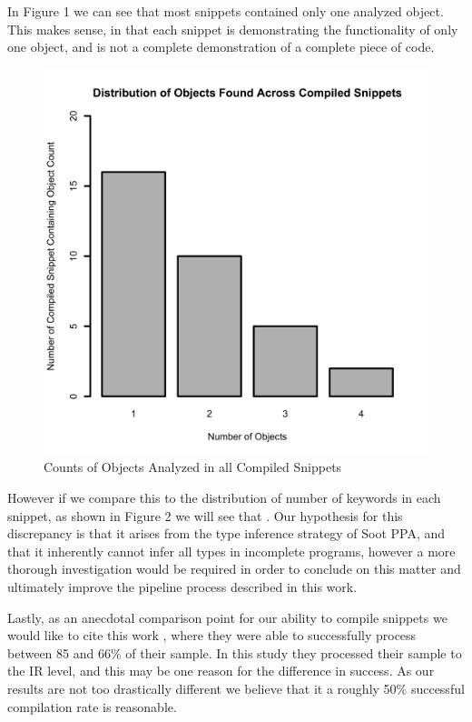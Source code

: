 \documentclass[10pt, conference]{IEEEtran}
\begin{document}
In Figure 1 we can see that most snippets contained only one analyzed object. This makes sense, in that each snippet is demonstrating the functionality of only one object, and is not a complete demonstration of a complete piece of code. 
\begin{figure}[h]
\begin{center}
\includegraphics[width=0.9\linewidth]{ObjectDist.png}
\caption{Counts of Objects Analyzed in all Compiled Snippets}
\end{center}
\end{figure}

However if we compare this to the distribution of number of keywords in each snippet, as shown in Figure 2 we will see that . Our hypothesis for this discrepancy is that it arises from the type inference strategy of Soot PPA, and that it inherently cannot infer all types in incomplete programs, however a more thorough investigation would be required in order to conclude on this matter and ultimately improve the pipeline process described in this work. 

Lastly, as an anecdotal comparison point for our ability to compile snippets we would like to cite this work \cite{7958574}, where they were able to successfully process between 85 and 66\% of their sample. In this study they processed their sample to the IR level, and this may be one reason for the difference in success. As our results are not too drastically different we believe that it a roughly 50\% successful compilation rate is reasonable.
\end{document}
